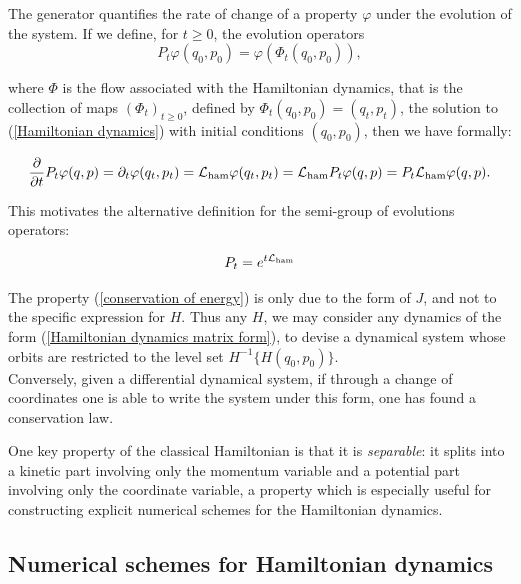     The generator quantifies the rate of change of a property $\varphi$ under the evolution of the system. If we define, for $t\geq 0$, the evolution operators 
    $$P_t \varphi (q_0,p_0) = \varphi(\Phi_t(q_0,p_0)),$$

where $\Phi$ is the flow associated with the Hamiltonian dynamics, that is the collection of maps $(\Phi_t)_{t\geq 0}$, defined by
    $\Phi_t (q_0,p_0) = (q_t,p_t)$, the solution to (\ref{Hamiltonian dynamics}) with initial conditions  $(q_0,p_0)$, then we have formally:

    $$ \frac \partial{\partial t} P_t \varphi (q,p)= \partial_t \varphi(q_t,p_t)= \mathcal{L}_{\rm ham} \varphi(q_t,p_t)=\mathcal{L}_{\rm ham} P_t \varphi(q,p)=P_t\mathcal{L}_{\rm ham} \varphi(q,p).$$

    This motivates the alternative definition for the semi-group of evolutions operators:

    \begin{equation}
        \label{hamiltonian_evolution_operator}
        P_t=e^{t\mathcal{L}_{\rm ham}}
    \end{equation}

  

    \begin{remark}
        \label{non-separable hamiltonian}
        The property (\ref{conservation of energy}) is only due to the form of $J$, and not to the specific expression for $H$.
        Thus any $H$, we may consider any dynamics of the form (\ref{Hamiltonian dynamics matrix form}), to devise a dynamical system whose orbits are restricted to the level set $H^{-1}\{H(q_0,p_0)\}$.\\
        Conversely, given a differential dynamical system, if through a change of coordinates one is able to write the system under this form, one has found a conservation law.
    \end{remark}



    One key property of the classical Hamiltonian is that it is \textit{separable}: it splits into a kinetic part involving only the momentum variable and a potential part involving only the coordinate variable, a property which is especially useful for constructing explicit numerical schemes for the Hamiltonian dynamics.
        \label{evolution operator exponential notation}

    \subsection{Numerical schemes for Hamiltonian dynamics}

